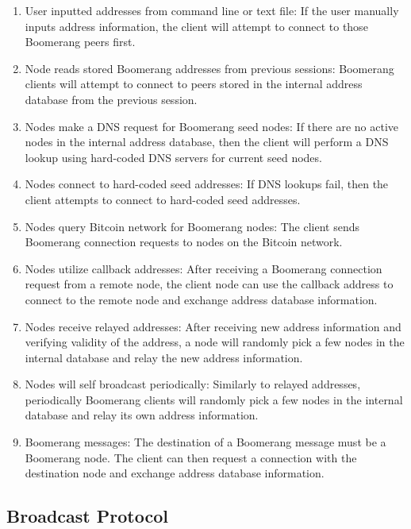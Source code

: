 \begin{enumerate}
	\item User inputted addresses from command line or text file: If the user manually inputs address information, the client will attempt to connect to those Boomerang peers first.
	\item Node reads stored Boomerang addresses from previous sessions: Boomerang clients will attempt to connect to peers stored in the internal address database from the previous session.
	\item Nodes make a DNS request for Boomerang seed nodes: If there are no active nodes in the internal address database, then the client will perform a DNS lookup using hard-coded DNS servers for current seed nodes.
	\item Nodes connect to hard-coded seed addresses: If DNS lookups fail, then the client attempts to connect to hard-coded seed addresses.
	\item Nodes query Bitcoin network for Boomerang nodes: The client sends Boomerang connection requests to nodes on the Bitcoin network.
	\item Nodes utilize callback addresses: After receiving a Boomerang connection request from a remote node, the client node can use the callback address to connect to the remote node and exchange address database information.
	\item Nodes receive relayed addresses: After receiving new address information and verifying validity of the address, a node will randomly pick a few nodes in the internal database and relay the new address information.
	\item Nodes will self broadcast periodically: Similarly to relayed addresses, periodically Boomerang clients will randomly pick a few nodes in the internal database and relay its own address information.
	\item Boomerang messages: The destination of a Boomerang message must be a Boomerang node. The client can then request a connection with the destination node and exchange address database information.
\end{enumerate}

\subsection{Broadcast Protocol}

